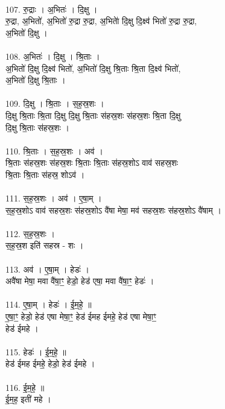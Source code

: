\\
107. रु॒द्राः । अ॒भितः॑ । दि॒क्षु ।\\
रु॒द्रा, अ॒भितो॑, अ॒भितो॑ रु॒द्रा रु॒द्रा, अ॒भिताे॑ दि॒क्षु दि॒क्ष्व॑ भितो॑ रु॒द्रा रु॒द्रा,\\
अ॒भितो॑ दि॒क्षु ।\\
\\
108. अ॒भितः॑ । दि॒क्षु । श्रि॒ताः ।\\
अ॒भितो॑ दि॒क्षु दि॒क्ष्व॑ भितो॑, अ॒भितो॑ दि॒क्षु श्रि॒ताः श्रि॒ता दि॒क्ष्व॑ भितो॑,\\
अ॒भितो॑ दि॒क्षु श्रि॒ताः ।\\
\\
109. दि॒क्षु । श्रि॒ताः । स॒ह॒स्र॒शः ।\\
दि॒क्षु श्रि॒ताः श्रि॒ता दि॒क्षु दि॒क्षु श्रि॒ताः स॑हस्र॒शः स॑हस्र॒शः श्रि॒ता दि॒क्षु\\
दि॒क्षु श्रि॒ताः स॑हस्र॒शः ।\\
\\
110. श्रि॒ताः । स॒ह॒स्र॒शः । अव॑ ।\\
श्रि॒ताः स॑हस्र॒शः स॑हस्र॒शः श्रि॒ताः श्रि॒ताः स॑हस्र॒शोऽ वाव॑ सहस्र॒शः\\
श्रि॒ताः श्रि॒ताः स॑हस्र॒ शोऽव॑ ।\\
\\
111. स॒ह॒स्र॒शः । अव॑ । ए॒षा॒म् ।\\
स॒ह॒स्र॒शोऽ वाव॑ सहस्र॒शः स॑हस्र॒शोऽ वै॑षा मेषा॒ मव॑ सहस्र॒शः स॑हस्र॒शोऽ वै॑षाम् ।\\
\\
112. स॒ह॒स्र॒शः ।\\
स॒ह॒स्र॒श इति॑ सहस्र - शः ।\\
\\
113. अव॑ । ए॒षा॒म् । हेडः॑ ।\\
अवै॑षा मेषा॒ मवा वै॑षा॒ꣳ॒ हेडो॒ हेड॑ एषा॒ मवा वै॑षा॒ꣳ॒ हेडः॑ ।\\
\\
114. ए॒षा॒म् । हेडः॑ । ई॒म॒हे॒ ॥\\
ए॒षा॒ꣳ॒ हेडो॒ हेड॑ एषा मेषा॒ꣳ॒ हेड॑ ईमह ईमहे॒ हेड॑ एषा मेषा॒ꣳ॒\\
हेड॑ ईमहे ।\\
\\
115. हेडः॑ । ई॒म॒हे॒ ॥\\
हेड॑ ईमह ईमहे॒ हेडो॒ हेड॑ ईमहे ।\\
\\
116. ई॒म॒हे॒ ॥\\
ई॒म॒ह॒ इती॑ महे ।\\
\\
